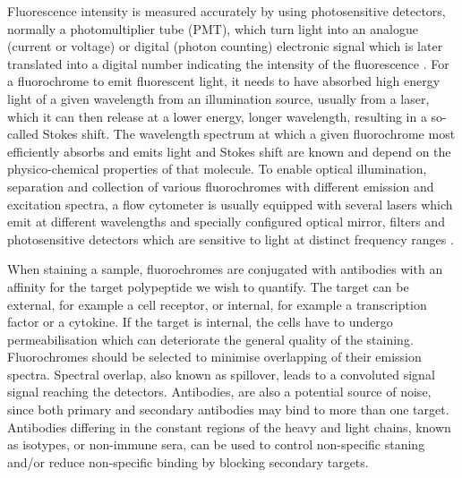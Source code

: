 Fluorescence intensity is measured accurately by using photosensitive detectors, normally a photomultiplier tube (PMT), which turn light into an analogue (current or voltage)
or digital (photon counting) electronic signal which is later translated into a digital number indicating the intensity of the fluorescence \citep{Shapiro:2003vq,Snow:2004ci}.
For a fluorochrome to emit fluorescent light, it needs to have absorbed high energy light of a given wavelength from an illumination source, usually from a laser, which it can then release at a lower energy, longer wavelength, resulting in a so-called Stokes shift.
The wavelength spectrum at which a given fluorochrome most efficiently absorbs and emits light and Stokes shift are known and depend on the physico-chemical properties of that molecule.
To enable optical illumination, separation and collection of various fluorochromes with different emission and excitation spectra, a flow cytometer is usually equipped with several lasers which emit at different wavelengths and specially configured optical mirror, filters and photosensitive detectors which are sensitive to light at distinct frequency ranges \citep{Shapiro:2003vq}.


When staining a sample, fluorochromes are conjugated with antibodies with an affinity for the target polypeptide we wish to quantify.
The target can be external, for example a cell receptor, or internal, for example a transcription factor or a cytokine.
If the target is internal, the cells have to undergo permeabilisation which can deteriorate the general quality of the staining.
Fluorochromes should be selected to minimise overlapping of their emission spectra.
Spectral overlap, also known as spillover, leads to a convoluted signal signal reaching the detectors.
Antibodies, are also a potential source of noise, since both primary and secondary antibodies may bind to more than one target.
Antibodies differing in the constant regions of the heavy and light chains, known as isotypes, or non-immune sera, can be used to control non-specific staning and/or reduce non-specific binding by blocking secondary targets.


